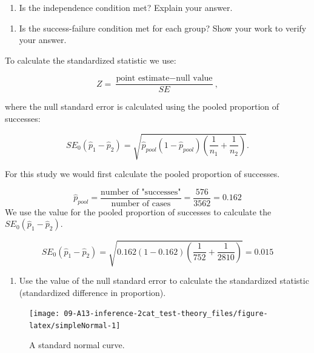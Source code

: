 \documentclass[
]{report}
\providecommand{\tightlist}{%
  \setlength{\itemsep}{0pt}\setlength{\parskip}{0pt}}
\begin{document}
\begin{enumerate}
\def\labelenumi{\arabic{enumi}.}
\setcounter{enumi}{4}
\tightlist
\item
  Is the independence condition met? Explain your answer.
\end{enumerate}

\vspace{0.4in}

\begin{enumerate}
\def\labelenumi{\arabic{enumi}.}
\setcounter{enumi}{5}
\tightlist
\item
  Is the success-failure condition met for each group? Show your work to verify your answer.
\end{enumerate}

\vspace{0.8in}
\newpage

To calculate the standardized statistic we use:

\[
Z = \frac{\text{point estimate} - \text{null value}}{SE},
\]

where the null standard error is calculated using the pooled proportion of successes:

\[
SE_0(\hat{p}_1-\hat{p}_2)=\sqrt{\hat{p}_{pool}(1-\hat{p}_{pool})\left(\frac{1}{n_1}+\frac{1}{n_2}\right)}.
\]

For this study we would first calculate the pooled proportion of successes.

\[\hat{p}_{pool} = \frac{\text{number of "successes"}}{\text{number of cases}} = \frac{576}{3562} = 0.162\]
We use the value for the pooled proportion of successes to calculate the \(SE_0(\hat{p}_1 - \hat{p}_2)\).

\[
SE_0(\hat{p}_1-\hat{p}_2)=\sqrt{0.162(1-0.162)\left(\frac{1}{752}+\frac{1}{2810}\right)} = 0.015
\]

\begin{enumerate}
\def\labelenumi{\arabic{enumi}.}
\setcounter{enumi}{6}
\tightlist
\item
  Use the value of the null standard error to calculate the standardized statistic (standardized difference in proportion).
\end{enumerate}

\vspace{1in}

\begin{figure}

{\centering \texttt{[image: 09-A13-inference-2cat\_test-theory\_files/figure-latex/simpleNormal-1]} 

}

\caption{A standard normal curve.}\label{fig:simpleNormal}
\end{figure}
\end{document}
